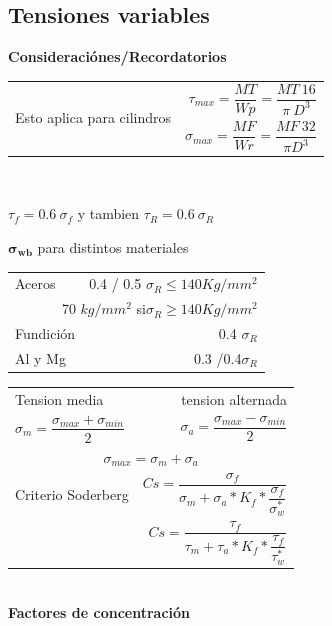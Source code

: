\documentclass[11pt,a4paper]{article}
\begin{document}
\begin{multicols}{2}
\begin{cajita}
	\end{cajita}


	\begin{cajita}
		\section*{Tensiones variables}
		\begin{cajita}
			\textbf{Consideraciónes/Recordatorios}\\\vspace{0.2cm}
			\begin{tabular}{l|r}
			\multirow[r]{2}{2.5 cm}{Esto aplica para cilindros}& $\tau_{max}=\dfrac{MT}{Wp}=\dfrac{MT~16}{\pi~D^{3}}$\\[0.3 cm]
				& $\sigma_{max}=\dfrac{MF}{Wr}=\dfrac{MF~32}{\pi D^{3}}$\\[0.2 cm]
			\end{tabular}\\\vspace{0.2cm}
		
		$\tau_{f}=0.6~\sigma_{f}$ y tambien $\tau_{R}=0.6~\sigma_{R}$ \\\vspace{0.3cm}
		
		$\mathbf{\sigma_{wb}}$ para distintos materiales\\\vspace*{0.2cm}
			\begin{tabular}{l|r}
				Aceros	& 0.4 / 0.5 $\sigma_{R}\leq140Kg/mm^{2}$\\
				\multicolumn{2}{r}{ 70 $kg/mm^{2}$ si$\sigma_{R}\geq140Kg/mm^{2}$}\\
				Fundición & 0.4 $\sigma_{R}$\\
				Al y Mg & 0.3 /0.4$\sigma_{R}$\\
				
			\end{tabular}
		
			
		
		\end{cajita}
		\begin{tabular}{l r}
			Tension media & tension alternada\\
			$\sigma_{m}=\dfrac{\sigma_{max}+\sigma_{min}}{2}$&$\sigma_{a}=\dfrac{\sigma_{max}-\sigma_{min}}{2}$\\[0.3cm]
			\multicolumn{2}{c}{$\sigma_{max}=\sigma_{m}+\sigma_{a}$}\\[0.3cm]
			Criterio Soderberg & $Cs=\dfrac{\sigma_{f}}{\sigma_{m}+\sigma_{a}*K_{f}*\dfrac{\sigma_{f}}{\sigma_{w}^{*}}}$\\[0.3cm]
			& $Cs=\dfrac{\tau_{f}}{\tau_{m}+\tau_{a}*K_{f}*\dfrac{\tau_{f}}{\tau_{w}^{*}}}$\\
		\end{tabular}\\
	\textbf{Factores de concentración}
	

\end{cajita}
\end{multicols}
\end{document}
